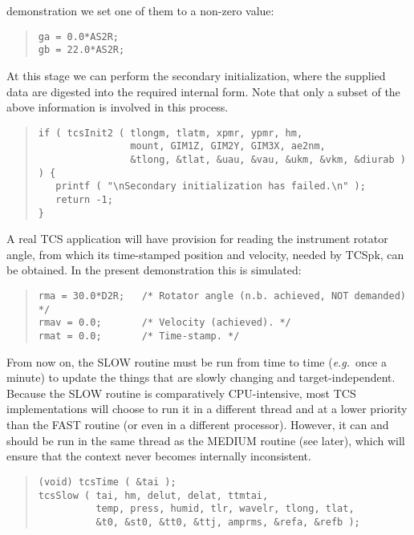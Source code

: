 \documentclass[12pt,fleqn,twoside]{article}
\renewcommand{\_}{{\tt\char'137}}     %
\begin{document}
demonstration we set one of them to a non-zero value:
\begin{quote}
\begin{small}
\begin{verbatim}
ga = 0.0*AS2R;
gb = 22.0*AS2R;
\end{verbatim}\end{small}
\end{quote}
At this stage we can perform the secondary initialization, where
the supplied data are digested into the required internal form.  Note
that only a subset of the above information is involved in this process.
\begin{quote}
\begin{small}
\begin{verbatim}
if ( tcsInit2 ( tlongm, tlatm, xpmr, ypmr, hm,
                mount, GIM1Z, GIM2Y, GIM3X, ae2nm,
                &tlong, &tlat, &uau, &vau, &ukm, &vkm, &diurab ) ) {
   printf ( "\nSecondary initialization has failed.\n" );
   return -1;
}
\end{verbatim}\end{small}
\end{quote}
A real TCS application will have provision for reading the
instrument rotator angle, from which its time-stamped position and
velocity, needed by TCSpk, can be obtained.  In the present
demonstration this is simulated:
\begin{quote}
\begin{small}
\begin{verbatim}
rma = 30.0*D2R;   /* Rotator angle (n.b. achieved, NOT demanded) */
rmav = 0.0;       /* Velocity (achieved). */
rmat = 0.0;       /* Time-stamp. */
\end{verbatim}\end{small}
\end{quote}
From now on, the SLOW routine must be run from time to time
({\it e.g.}~once a minute) to update the things that are slowly changing
and target-independent.  Because the SLOW routine is comparatively
CPU-intensive, most TCS implementations will choose to run it in a
different thread and at a lower priority than the FAST routine (or
even in a different processor).  However, it can and should be run
in the same thread as the MEDIUM routine (see later), which will
ensure that the context never becomes internally inconsistent.
\begin{quote}
\begin{small}
\begin{verbatim}
(void) tcsTime ( &tai );
tcsSlow ( tai, hm, delut, delat, ttmtai,
          temp, press, humid, tlr, wavelr, tlong, tlat,
          &t0, &st0, &tt0, &ttj, amprms, &refa, &refb );
\end{verbatim}\end{small}
\end{quote}
\end{document}
